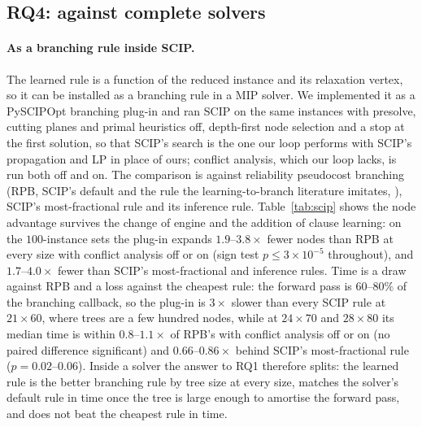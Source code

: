 \documentclass[final,5p,times,twocolumn,authoryear]{elsarticle}
\begin{document}
\subsection{RQ4: against complete solvers}
\label{sec:rq4}



\paragraph{As a branching rule inside SCIP.} The learned rule is a function of the reduced instance and its relaxation vertex, so it can be installed as a branching rule in a MIP solver. We implemented it as a PySCIPOpt branching plug-in and ran SCIP \citep{bestuzheva2021scip} on the same instances with presolve, cutting planes and primal heuristics off, depth-first node selection and a stop at the first solution, so that SCIP's search is the one our loop performs with SCIP's propagation and LP in place of ours; conflict analysis, which our loop lacks, is run both off and on. The comparison is against reliability pseudocost branching (RPB, SCIP's default and the rule the learning-to-branch literature imitates, \citealp{achterberg2005branching}), SCIP's most-fractional rule and its inference rule. Table~\ref{tab:scip} shows the node advantage survives the change of engine and the addition of clause learning: on the $100$-instance sets the plug-in expands $1.9$--$3.8\times$ fewer nodes than RPB at every size with conflict analysis off or on (sign test $p\le3\times10^{-5}$ throughout), and $1.7$--$4.0\times$ fewer than SCIP's most-fractional and inference rules. Time is a draw against RPB and a loss against the cheapest rule: the forward pass is $60$--$80\%$ of the branching callback, so the plug-in is $3\times$ slower than every SCIP rule at $21\times60$, where trees are a few hundred nodes, while at $24\times70$ and $28\times80$ its median time is within $0.8$--$1.1\times$ of RPB's with conflict analysis off or on (no paired difference significant) and $0.66$--$0.86\times$ behind SCIP's most-fractional rule ($p=0.02$--$0.06$). Inside a solver the answer to RQ1 therefore splits: the learned rule is the better branching rule by tree size at every size, matches the solver's default rule in time once the tree is large enough to amortise the forward pass, and does not beat the cheapest rule in time.


\end{document}
